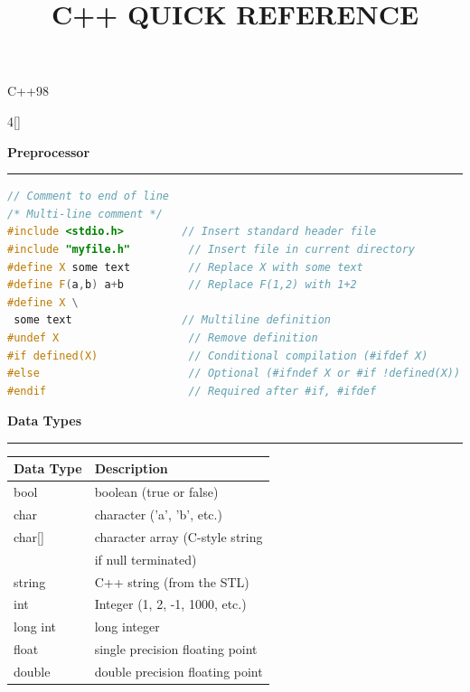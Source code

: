 \documentclass[final]{beamer}
\title{C++ QUICK REFERENCE}
\renewcommand{\section}[1]{%
  \par\vspace{1em}%
  {\noindent\Large\bfseries #1\par}%
  \vspace{0.5em}\hrule\vspace{1em}%
}
\begin{document}


\begin{frame}[t,fragile]{C++98} 
\setlength{\columnseprule}{0.4pt}  %

\begin{multicols}{4}[\setlength{\columnsep}{1.5cm}]


\vspace{-1cm}
\section{Preprocessor}
\vspace{-1cm}
\begin{lstlisting}[language=C++]
// Comment to end of line
/* Multi-line comment */
#include <stdio.h>         // Insert standard header file
#include "myfile.h"         // Insert file in current directory
#define X some text         // Replace X with some text
#define F(a,b) a+b          // Replace F(1,2) with 1+2
#define X \
 some text                 // Multiline definition
#undef X                    // Remove definition
#if defined(X)              // Conditional compilation (#ifdef X)
#else                       // Optional (#ifndef X or #if !defined(X))
#endif                      // Required after #if, #ifdef
\end{lstlisting}

 \vspace{-1cm}
\section{Data Types}
\vspace{-1cm}
\begin{tabular}{|l|l|}
\hline
\textbf{Data Type} & \textbf{Description} \\
\hline
bool & boolean (true or false) \\
\hline
char & character ('a', 'b', etc.) \\
\hline
char[] & character array (C-style string  \\
 & if null terminated) \\
\hline
string & C++ string (from the STL) \\
\hline
int & Integer (1, 2, -1, 1000, etc.) \\
\hline
long int & long integer \\
\hline
float & single precision floating point \\
\hline
double & double precision floating point \\
\hline
\end{tabular}


\end{multicols}
\end{frame}
\end{document}
